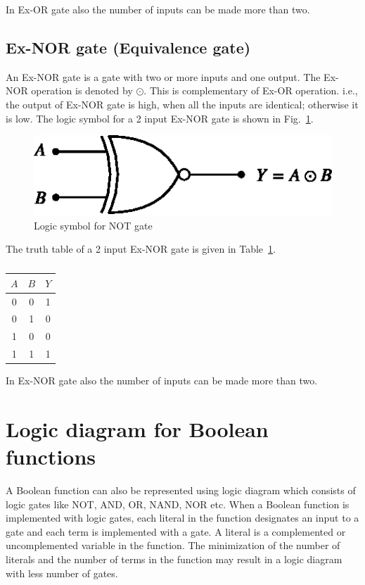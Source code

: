 In Ex-OR gate also the number of inputs can be made more than two.

\subsection{Ex-NOR gate (Equivalence gate)}\label{sec5.14.6}

An Ex-NOR gate is a gate with two or more inputs and one output. The Ex-NOR operation is denoted by $\odot$. This is complementary of Ex-OR operation. i.e., the output of Ex-NOR gate is high, when all the inputs are identical; otherwise it is low. The logic symbol for a 2 input Ex-NOR gate is shown in Fig.~\ref{fig5.15}.
\begin{figure}[H]
\centering
\includegraphics{chap5/fig5.16.eps}
\caption{Logic symbol for NOT gate}\label{fig5.15}
\end{figure}

The truth table of a 2 input Ex-NOR gate is given in Table~\ref{tab5.15}.
\begin{table}[H]
\centering
\caption{}\label{tab5.15}
\tabcolsep=10pt
\renewcommand{\arraystretch}{1.2}
\begin{tabular}{|cc|c|}
\hline
\boldmath$A$ & \boldmath$B$ & \boldmath$Y$\\
\hline
0 & 0 & 1\\
0 & 1 & 0\\
1 & 0 & 0\\
1 & 1 & 1\\
\hline
\end{tabular}
\end{table}

In Ex-NOR gate also the number of inputs can be made more than two.

\section{Logic diagram for Boolean functions}\label{sec5.15}

A Boolean function can also be represented using logic diagram which consists of logic gates like NOT, AND, OR, NAND, NOR etc. When a Boolean function is implemented with logic gates, each literal in the function designates an input to a gate and each term is implemented with a gate. A literal is a complemented or uncomplemented variable in the function. The minimization of the number of literals and the number of terms in the function may result in a logic diagram with less number of gates.

